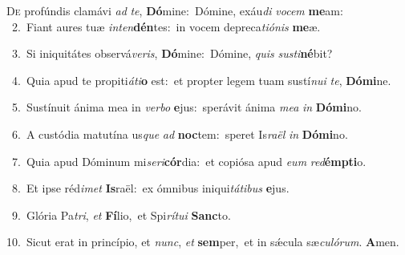 \lettrine{\initial\textcolor{\initialcolor}{D}}{e} profúndis clamávi \textit{ad} \textit{te}\-, \textbf{Dó}\-mine:~\star Dómine, exáu\textit{di} \textit{vo}\-\textit{cem} \textbf{me}\-am:\\
{\numbfont\textcolor{\numbcolor}{~2.}}~Fiant aures tuæ \textit{in}\-\textit{ten}\textbf{dén}tes:~\star in vocem depreca\-\textit{ti}\-\textit{ó}\textit{nis} \textbf{me}\-æ.\par
{\numbfont\textcolor{\numbcolor}{~3.}}~Si iniquitátes observá\-\textit{ve}\-\textit{ris}, \textbf{Dó}\-mine:~\star Dómine, \textit{quis} \textit{sus}\-\textit{ti}\textbf{né}bit?\par
{\numbfont\textcolor{\numbcolor}{~4.}}~Quia apud te propiti\-\textit{á}\-\textit{ti}\textbf{o} est:~\star et propter legem tuam sustí\-\textit{nu}\-\textit{i} \textit{te}\-, \textbf{Dó}\-\textbf{mi}ne.\par
{\numbfont\textcolor{\numbcolor}{~5.}}~Sustínuit ánima mea in \textit{ver}\-\textit{bo} \textbf{e}\-jus:~\star sperávit ánima \textit{me}\-\textit{a} \textit{in} \textbf{Dó}\-\textbf{mi}no.\par
{\numbfont\textcolor{\numbcolor}{~6.}}~A custódia matutína us\textit{que} \textit{ad} \textbf{noc}\-tem:~\star speret Is\-\textit{ra}\-\textit{ël} \textit{in} \textbf{Dó}\-\textbf{mi}no.\par
{\numbfont\textcolor{\numbcolor}{~7.}}~Quia apud Dóminum mi\-\textit{se}\-\textit{ri}\textbf{cór}dia:~\star et copiósa apud \textit{e}\-\textit{um} \textit{red}\-\textbf{émp}\textbf{ti}o.\par
{\numbfont\textcolor{\numbcolor}{~8.}}~Et ipse réd\-\textit{i}\-\textit{met} \textbf{Is}\-raël:~\star ex ómnibus iniqui\-\textit{tá}\-\textit{ti}\textit{bus} \textbf{e}\-jus.\par
{\numbfont\textcolor{\numbcolor}{~9.}}~Glória Pa\-\textit{tri}\-, \textit{et} \textbf{Fí}\-lio,~\star et Spi\-\textit{rí}\-\textit{tu}\textit{i} \textbf{Sanc}\-to.\par
{\numbfont\textcolor{\numbcolor}{10.}}~Sicut erat in princípio, et \textit{nunc}\-, \textit{et} \textbf{sem}\-per,~\star et in sǽcula sæ\-\textit{cu}\-\textit{ló}\textit{rum}. \textbf{A}\-men.\par
